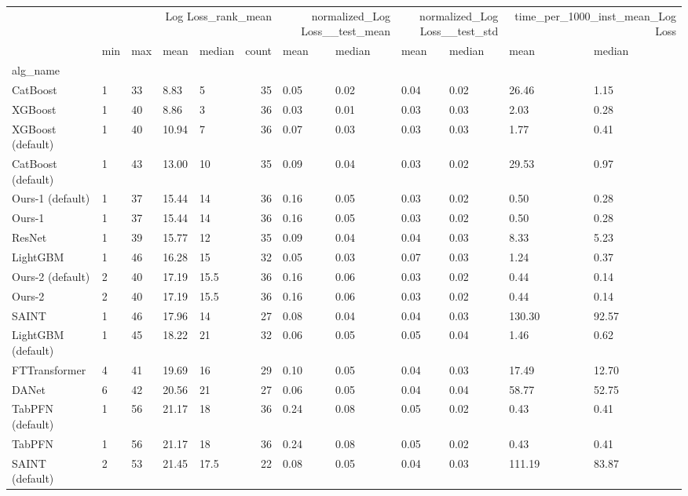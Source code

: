\begin{tabular}{lllllrllllll}
\toprule
 & \multicolumn{5}{r}{Log Loss_rank_mean} & \multicolumn{2}{r}{normalized_Log Loss__test_mean} & \multicolumn{2}{r}{normalized_Log Loss__test_std} & \multicolumn{2}{r}{time_per_1000_inst_mean_Log Loss} \\
 & min & max & mean & median & count & mean & median & mean & median & mean & median \\
alg_name &  &  &  &  &  &  &  &  &  &  &  \\
\midrule
CatBoost & 1 & 33 & 8.83 & 5 & 35 & 0.05 & 0.02 & 0.04 & 0.02 & 26.46 & 1.15 \\
XGBoost & 1 & 40 & 8.86 & 3 & 36 & 0.03 & 0.01 & 0.03 & 0.03 & 2.03 & 0.28 \\
XGBoost (default) & 1 & 40 & 10.94 & 7 & 36 & 0.07 & 0.03 & 0.03 & 0.03 & 1.77 & 0.41 \\
CatBoost (default) & 1 & 43 & 13.00 & 10 & 35 & 0.09 & 0.04 & 0.03 & 0.02 & 29.53 & 0.97 \\
Ours-1 (default) & 1 & 37 & 15.44 & 14 & 36 & 0.16 & 0.05 & 0.03 & 0.02 & 0.50 & 0.28 \\
Ours-1 & 1 & 37 & 15.44 & 14 & 36 & 0.16 & 0.05 & 0.03 & 0.02 & 0.50 & 0.28 \\
ResNet & 1 & 39 & 15.77 & 12 & 35 & 0.09 & 0.04 & 0.04 & 0.03 & 8.33 & 5.23 \\
LightGBM & 1 & 46 & 16.28 & 15 & 32 & 0.05 & 0.03 & 0.07 & 0.03 & 1.24 & 0.37 \\
Ours-2 (default) & 2 & 40 & 17.19 & 15.5 & 36 & 0.16 & 0.06 & 0.03 & 0.02 & 0.44 & 0.14 \\
Ours-2 & 2 & 40 & 17.19 & 15.5 & 36 & 0.16 & 0.06 & 0.03 & 0.02 & 0.44 & 0.14 \\
SAINT & 1 & 46 & 17.96 & 14 & 27 & 0.08 & 0.04 & 0.04 & 0.03 & 130.30 & 92.57 \\
LightGBM (default) & 1 & 45 & 18.22 & 21 & 32 & 0.06 & 0.05 & 0.05 & 0.04 & 1.46 & 0.62 \\
FTTransformer & 4 & 41 & 19.69 & 16 & 29 & 0.10 & 0.05 & 0.04 & 0.03 & 17.49 & 12.70 \\
DANet & 6 & 42 & 20.56 & 21 & 27 & 0.06 & 0.05 & 0.04 & 0.04 & 58.77 & 52.75 \\
TabPFN (default) & 1 & 56 & 21.17 & 18 & 36 & 0.24 & 0.08 & 0.05 & 0.02 & 0.43 & 0.41 \\
TabPFN & 1 & 56 & 21.17 & 18 & 36 & 0.24 & 0.08 & 0.05 & 0.02 & 0.43 & 0.41 \\
SAINT (default) & 2 & 53 & 21.45 & 17.5 & 22 & 0.08 & 0.05 & 0.04 & 0.03 & 111.19 & 83.87 \\

\end{tabular}

